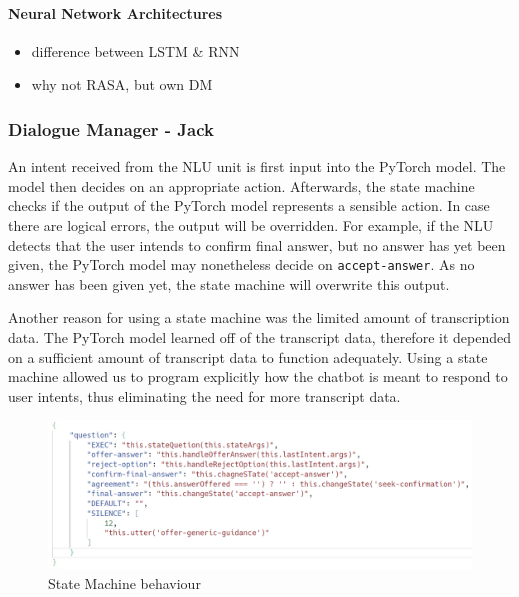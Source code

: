 \documentclass[hidelinks, 11pt]{article}
\begin{document}
\paragraph{Neural Network Architectures}
\label{par:nn_architectures}

\begin{itemize}
  \item difference between LSTM \& RNN
  \item why not RASA, but own DM
\end{itemize}

\subsubsection{Dialogue Manager - Jack}
\label{subsec:dm}

An intent received from the NLU unit is first input into the PyTorch model. The model then decides on an appropriate action. Afterwards, the state machine checks if the output of the PyTorch model represents a sensible action. In case there are logical errors, the output will be overridden. For example, if the NLU detects that the user intends to confirm final answer, but no answer has yet been given, the PyTorch model may nonetheless decide on \verb|accept-answer|. As no answer has been given yet, the state machine will overwrite this output.

Another reason for using a state machine was the limited amount of transcription data. The PyTorch model learned off of the transcript data, therefore it depended on a sufficient amount of transcript data to function adequately. Using a state machine allowed us to program explicitly how the chatbot is meant to respond to user intents, thus eliminating the need for more transcript data.

\begin{figure}[h!]
  \includegraphics[width=\columnwidth]{images/jacks_figure.png}
  \caption{State Machine behaviour}
  \label{fig:jacks_figure}
\end{figure}
\end{document}
